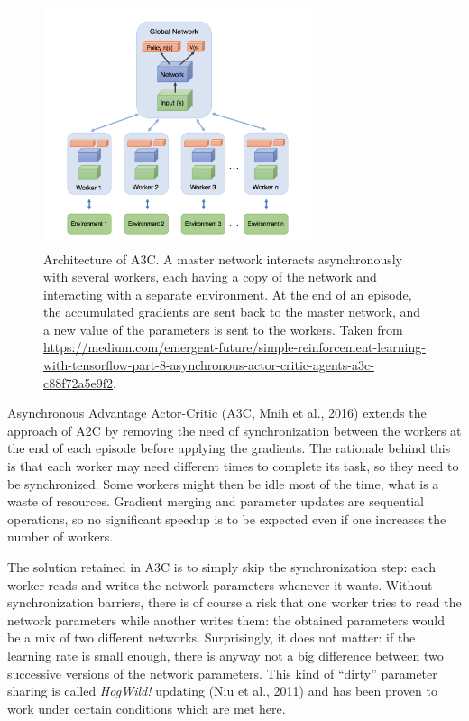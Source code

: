 \documentclass[
  letterpaper,
  DIV=11,
  numbers=noendperiod]{scrreprt}
\begin{document}
\begin{figure}

{\centering \includegraphics[width=0.7\textwidth,height=\textheight]{./img/A3C_architecture.png}

}

\caption{\label{fig-a3carchi}Architecture of A3C. A master network
interacts asynchronously with several workers, each having a copy of the
network and interacting with a separate environment. At the end of an
episode, the accumulated gradients are sent back to the master network,
and a new value of the parameters is sent to the workers. Taken from
\url{https://medium.com/emergent-future/simple-reinforcement-learning-with-tensorflow-part-8-asynchronous-actor-critic-agents-a3c-c88f72a5e9f2}.}

\end{figure}

Asynchronous Advantage Actor-Critic (A3C, Mnih et al., 2016) extends the
approach of A2C by removing the need of synchronization between the
workers at the end of each episode before applying the gradients. The
rationale behind this is that each worker may need different times to
complete its task, so they need to be synchronized. Some workers might
then be idle most of the time, what is a waste of resources. Gradient
merging and parameter updates are sequential operations, so no
significant speedup is to be expected even if one increases the number
of workers.

The solution retained in A3C is to simply skip the synchronization step:
each worker reads and writes the network parameters whenever it wants.
Without synchronization barriers, there is of course a risk that one
worker tries to read the network parameters while another writes them:
the obtained parameters would be a mix of two different networks.
Surprisingly, it does not matter: if the learning rate is small enough,
there is anyway not a big difference between two successive versions of
the network parameters. This kind of ``dirty'' parameter sharing is
called \emph{HogWild!} updating (Niu et al., 2011) and has been proven
to work under certain conditions which are met here.
\end{document}
